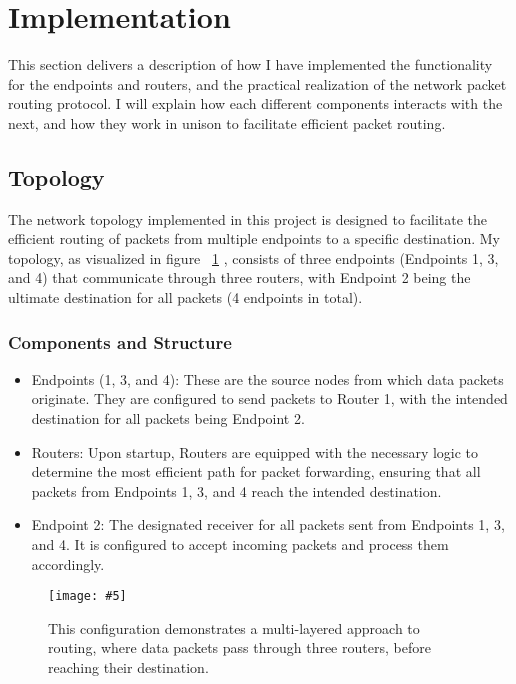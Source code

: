 \documentclass{article}
\newcommand{\includescalefigure}[5]{
\begin{figure}[htb]
\centering
\texttt{[image: \#5]}
\captionsetup{width=.8\linewidth} 
\caption[#2]{#3}
\label{#1}
\end{figure}
}
\begin{document}
\section{Implementation}
\label{sec:Implementation}

This section delivers a description of how I have implemented the functionality for the endpoints and routers, and the practical realization of the network packet routing protocol. I will explain how each different components interacts with the next, and how they work in unison to facilitate efficient packet routing.


\subsection{Topology}

The network topology implemented in this project is designed to facilitate the efficient routing of packets from multiple endpoints to a specific destination. My topology, as visualized in figure ~\ref{fig:newtopology} , consists of three endpoints (Endpoints 1, 3, and 4) that communicate through three routers, with Endpoint 2 being the ultimate destination for all packets (4 endpoints in total).

\subsubsection*{Components and Structure}
\begin{itemize}
	\item Endpoints (1, 3, and 4): These are the source nodes from which data packets originate. They are configured to send packets to Router 1, with the intended destination for all packets being Endpoint 2. 
	\item Routers: Upon startup, Routers are equipped with the necessary logic to determine the most efficient path for packet forwarding, ensuring that all packets from Endpoints 1, 3, and 4 reach the intended destination.
	\item Endpoint 2: The designated receiver for all packets sent from Endpoints 1, 3, and 4. It is configured to accept incoming packets and process them accordingly.
\end{itemize}

\includescalefigure{fig:newtopology}{Design Of Topology}{This configuration demonstrates a multi-layered approach to routing, where data packets pass through three routers,  before reaching their destination.}{0.7}{newtopology.png}
\end{document}
